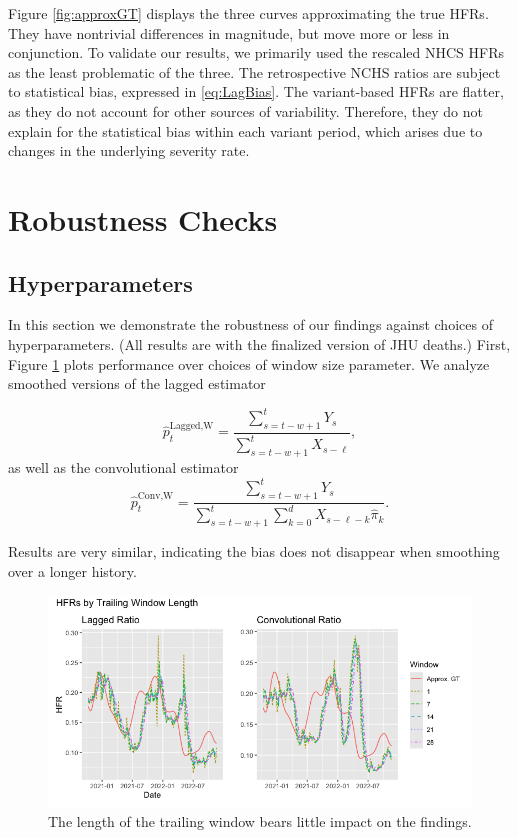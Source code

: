 \documentclass{article}
\begin{document}
Figure \ref{fig:approxGT} displays the three curves approximating the true HFRs. They have nontrivial differences in magnitude, but move more or less in conjunction. To validate our results, we primarily used the rescaled NHCS HFRs as the least problematic of the three. The retrospective NCHS ratios are subject to statistical bias, expressed in \ref{eq:LagBias}. The variant-based HFRs are flatter, as they do not account for other sources of variability. Therefore, they do not explain for the statistical bias within each variant period, which arises due to changes in the underlying severity rate.  %

\section{Robustness Checks}\label{apx:robustness}
\subsection{Hyperparameters}
In this section we demonstrate the robustness of our findings against choices of hyperparameters. (All results are with the finalized version of JHU deaths.) First, Figure \ref{fig:window} plots performance over choices of window size parameter. We analyze smoothed versions of the lagged estimator

\begin{equation}\label{eq:laggedSmooth}
    \hat{p}_t^\text{Lagged,W} = \frac{\sum_{s=t-w+1}^{t} Y_s}{\sum_{s=t-w+1}^{t} X_{s-\ell}},
\end{equation}
\noindent as well as the convolutional estimator
\begin{equation}\label{eq:convSmooth}
    \hat{p}_t^\text{Conv,W} = \frac{\sum_{s=t-w+1}^{t} Y_s}{\sum_{s=t-w+1}^{t} \sum_{k=0}^d X_{s-\ell-k}\hat\pi_k}.
\end{equation}

\noindent Results are very similar, indicating the bias does not disappear when smoothing over a longer history. 

\begin{figure}
    \centering
    \includegraphics[width=0.75\linewidth]{Figs/window_size.png}
    \caption{The length of the trailing window bears little impact on the findings.}
    \label{fig:window}
\end{figure}
\end{document}
